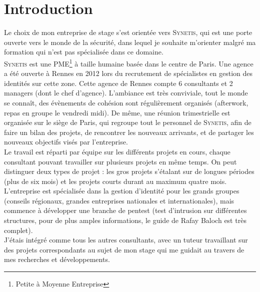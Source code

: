 \section*{Introduction} %
\label{intro}

%
%
%
Le choix de mon entreprise de stage s'est orientée vers \textsc{Synetis}, qui est une porte ouverte vers le monde de la sécurité, dans lequel je souhaite m'orienter malgré ma formation qui n'est pas spécialisée dans ce domaine.\\
\textsc{Synetis} est une PME\footnote{Petite à Moyenne Entreprise} à taille humaine basée dans le centre de Paris. Une agence a été ouverte à Rennes en 2012 lors du recrutement de spécialistes en gestion des identités sur cette zone. Cette agence de Rennes compte 6 consultants et 2 managers (dont le chef d'agence). L'ambiance est très conviviale, tout le monde se connaît, des évènements de cohésion sont régulièrement organisés (afterwork, repas en groupe le vendredi midi). De même, une réunion trimestrielle est organisée sur le siège de Paris, qui regroupe tout le personnel de \textsc{Synetis}, afin de faire un bilan des projets, de rencontrer les nouveaux arrivants, et de partager les nouveaux objectifs visés par l'entreprise.\\
Le travail est réparti par équipe sur les différents projets en cours, chaque consultant pouvant travailler sur plusieurs projets en même temps. On peut distinguer deux types de projet : les gros projets s'étalant sur de longues périodes (plus de six mois) et les projets courts durant au maximum quatre mois. L'entreprise est spécialisée dans la gestion d'identité pour les grands groupes (conseils régionaux, grandes entreprises nationales et internationales), mais commence à développer une branche de pentest (test d'intrusion sur différentes structures, pour de plus amples informations, le guide de Rafay Baloch \cite{rba} est très complet).\\
J'étais intégré comme tous les autres consultants, avec un tuteur travaillant sur des projets correspondants au sujet de mon stage qui me guidait au travers de mes recherches et développements.\\
